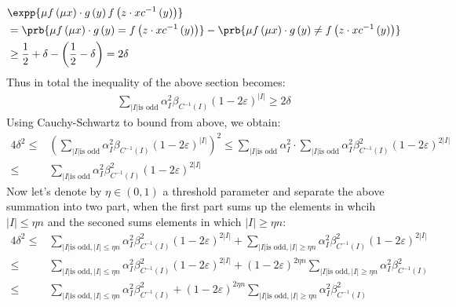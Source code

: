 \documentclass{article}
\begin{document}
\begin{equation*}
  \begin{split}
    & \expp{\mu f\left( \mu x \right) \cdot g\left( y \right)f\left(z \cdot x c^{-1}\left( y \right)  \right)} \\ 
    & = \prb{\mu f\left( \mu x \right) \cdot g\left( y \right) = f\left(z \cdot x c^{-1}\left( y \right)  \right)} -  \prb{\mu f\left( \mu x \right) \cdot g\left( y \right) \neq f\left(z \cdot x c^{-1}\left( y \right)  \right)} \\ 
   & \ge \frac{1}{2}+\delta - \left( \frac{1}{2} - \delta \right) = 2\delta
  \end{split}
\end{equation*}
Thus in total the inequality of the above section becomes: 
 \begin{equation*}
   \begin{split}
     \sum_{|I| \text{is odd} }{\alpha_{I}^{2}\beta_{C^{-1}(I)}  \left( 1 -2 \varepsilon \right)^{|I|}} \ge 2\delta 
   \end{split}
 \end{equation*}
Using Cauchy-Schwartz to bound from above, we obtain: 
\begin{equation*}
   \begin{split}
     4\delta^{2} \le & \left( \sum_{|I| \text{is odd} }{\alpha_{I}^{2}\beta_{C^{-1}(I)}  \left( 1 -2 \varepsilon \right)^{|I|}} \right)^{2}  \le  \sum_{|I| \text{is odd} }{ \alpha_{I}^{2}  } \cdot  \sum_{|I| \text{is odd} }{\alpha_{I}^{2}\beta_{C^{-1}(I)}^{2}  \left( 1 -2 \varepsilon \right)^{2|I|}} \\ 
    \le  &  \sum_{|I| \text{is odd} }{\alpha_{I}^{2}\beta_{C^{-1}(I)}^{2}  \left( 1 -2 \varepsilon \right)^{2|I|}} 
   \end{split}
 \end{equation*}
 Now let's denote by $\eta \in \left( 0,1 \right)$ a threshold parameter and separate the above summation into two part, when the first part sums up the elements in whcih $|I| \le \eta n$ and the seconed sums elements in which $|I| \ge \eta n$: 
 \begin{equation*}
   \begin{split}
     4\delta^{2} \le &  \sum_{|I| \text{is odd} , |I| \le \eta n  }{\alpha_{I}^{2}\beta_{C^{-1}(I)}^{2}  \left( 1 -2 \varepsilon \right)^{2|I|}} + \sum_{|I| \text{is odd} , |I| \ge \eta n  }{\alpha_{I}^{2}\beta_{C^{-1}(I)}^{2}  \left( 1 -2 \varepsilon \right)^{2|I|}} \\ 
     \le &  \sum_{|I| \text{is odd} , |I| \le \eta n  }{\alpha_{I}^{2}\beta_{C^{-1}(I)}^{2}  \left( 1 -2 \varepsilon \right)^{2|I|}} + \left( 1 -2 \varepsilon \right)^{2\eta n }\sum_{|I| \text{is odd} , |I| \ge \eta n  }{\alpha_{I}^{2}\beta_{C^{-1}(I)}^{2}  } \\ 
\le &  \sum_{|I| \text{is odd} , |I| \le \eta n  }{\alpha_{I}^{2}\beta_{C^{-1}(I)}^{2}} + \left( 1 -2 \varepsilon \right)^{2\eta n }\sum_{|I| \text{is odd} , |I| \ge \eta n  }{\alpha_{I}^{2}\beta_{C^{-1}(I)}^{2}  } 
   \end{split}
 \end{equation*}
\end{document}
